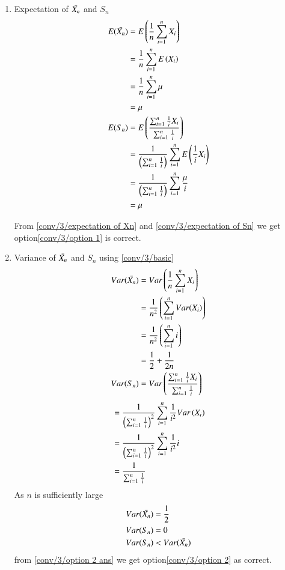 \begin{enumerate}
    \item Expectation of $\Bar{X_{n}}$ and $S_{n}$
    \begin{align}
    E(\Bar{X_{n}}) &= E\left(\frac{1}{n}\sum_{i=1}^{n}X_{i}\right)\\
                   &= \frac{1}{n}\sum_{i=1}^{n}E\left(X_{i}\right)\\
                   &= \frac{1}{n}\sum_{i=1}^{n}\mu\\
                   &= \mu \label{conv/3/expectation of Xn}\\
      E(S_{n}) &= E\left(\frac{\sum_{i=1}^{n}\frac{1}{i}X_{i}}{\sum_{i=1}^{n}\frac{1}{i}}\right)      \\
               &= \frac{1}{\left(\sum_{i=1}^{n}\frac{1}{i}\right)}\sum_{i=1}^{n}E\left(\frac{1}{i}X_{i}\right)\\
               &= \frac{1}{\left(\sum_{i=1}^{n}\frac{1}{i}\right)}\sum_{i=1}^{n}\frac{\mu}{i}\\
               &= \mu   \label{conv/3/expectation of Sn}
   \end{align}
   
   From \eqref{conv/3/expectation of Xn} and \eqref{conv/3/expectation of Sn} we get option\eqref{conv/3/option 1} is correct.
   
   \item 
    Variance of $\Bar{X_{n}}$ and $S_{n}$ using \eqref{conv/3/basic}
    \begin{align}
    Var(\Bar{X_{n}})&= Var\left(\frac{1}{n}\sum_{i=1}^{n}X_{i}\right)\\
                   &= \frac{1}{n^{2}}\left(\sum_{i=1}^{n}Var(X_{i})\right)\\
                   &= \frac{1}{n^{2}}\left(\sum_{i=1}^{n}i\right)\\
                   &= \frac{1}{2} + \frac{1}{2n}\label{conv/3/variance of Xn}\\
    Var(S_{n}) &= Var\left(\frac{\sum_{i=1}^{n}\frac{1}{i}X_{i}}{\sum_{i=1}^{n} \frac{1}{i}}\right)
    \end{align}
    \begin{align}
               &= \frac{1}{\left(\sum_{i=1}^{n}\frac{1}{i}\right)^{2}}\sum_{i=1}^{n}\frac{1}{i^{2}}Var\left(X_{i}\right)\\
               &= \frac{1}{\left(\sum_{i=1}^{n}\frac{1}{i}\right)^{2}}\sum_{i=1}^{n}\frac{1}{i^{2}}i\\
               &= \frac{1}{\sum_{i=1}^{n}\frac{1}{i}}\label{conv/3/Variance of Sn}
   \end{align}
   As $n$ is sufficiently large 
   \begin{align}
       Var(\Bar{X_{n}}) &= \frac{1}{2}\\
       Var(S_{n})       &= 0\\
       Var(S_{n}) &< Var(\Bar{X_{n}})\label{conv/3/option 2 ans}
   \end{align}
   from \eqref{conv/3/option 2 ans} we get option\eqref{conv/3/option 2} as correct.
   

\end{enumerate}

